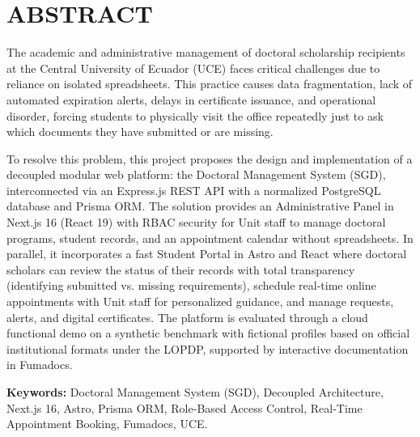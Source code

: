 
\pagestyle{empty}
\onehalfspacing
\fontsize{12}{18}\selectfont

\section*{ABSTRACT}

The academic and administrative management of doctoral scholarship recipients at the Central University of Ecuador (UCE) faces critical challenges due to reliance on isolated spreadsheets. This practice causes data fragmentation, lack of automated expiration alerts, delays in certificate issuance, and operational disorder, forcing students to physically visit the office repeatedly just to ask which documents they have submitted or are missing.

To resolve this problem, this project proposes the design and implementation of a decoupled modular web platform: the Doctoral Management System (SGD), interconnected via an Express.js REST API with a normalized PostgreSQL database and Prisma ORM. The solution provides an Administrative Panel in Next.js 16 (React 19) with RBAC security for Unit staff to manage doctoral programs, student records, and an appointment calendar without spreadsheets. In parallel, it incorporates a fast Student Portal in Astro and React where doctoral scholars can review the status of their records with total transparency (identifying submitted vs. missing requirements), schedule real-time online appointments with Unit staff for personalized guidance, and manage requests, alerts, and digital certificates. The platform is evaluated through a cloud functional demo on a synthetic benchmark with fictional profiles based on official institutional formats under the LOPDP, supported by interactive documentation in Fumadocs.

\vspace{0.5cm}
\textbf{Keywords:} Doctoral Management System (SGD), Decoupled Architecture, Next.js 16, Astro, Prisma ORM, Role-Based Access Control, Real-Time Appointment Booking, Fumadocs, UCE.

\newpage
